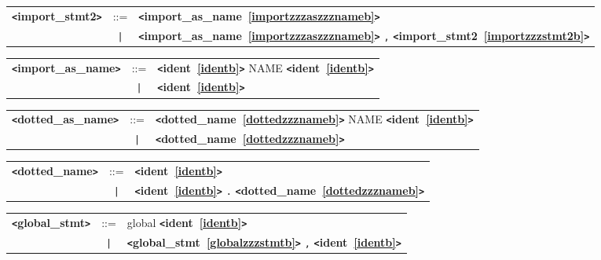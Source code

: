 \label{importzzzstmt2b}
\begin{tabular}{lcl}
{\bf \verb+<+import\_stmt2\verb+>+} & ::=  & {\bf \verb+<+import\_as\_name~\ref{importzzzaszzznameb}\verb+>+}  \\
 & \verb+|+  & {\bf \verb+<+import\_as\_name~\ref{importzzzaszzznameb}\verb+>+}  \verb|,| {\bf \verb+<+import\_stmt2~\ref{importzzzstmt2b}\verb+>+}  \\
\end{tabular}

\label{importzzzaszzznameb}
\begin{tabular}{lcl}
{\bf \verb+<+import\_as\_name\verb+>+} & ::=  & {\bf \verb+<+ident~\ref{identb}\verb+>+}  NAME {\bf \verb+<+ident~\ref{identb}\verb+>+}  \\
 & \verb+|+  & {\bf \verb+<+ident~\ref{identb}\verb+>+}  \\
\end{tabular}

\label{dottedzzzaszzznameb}
\begin{tabular}{lcl}
{\bf \verb+<+dotted\_as\_name\verb+>+} & ::=  & {\bf \verb+<+dotted\_name~\ref{dottedzzznameb}\verb+>+}  NAME {\bf \verb+<+ident~\ref{identb}\verb+>+}  \\
 & \verb+|+  & {\bf \verb+<+dotted\_name~\ref{dottedzzznameb}\verb+>+}  \\
\end{tabular}

\label{dottedzzznameb}
\begin{tabular}{lcl}
{\bf \verb+<+dotted\_name\verb+>+} & ::=  & {\bf \verb+<+ident~\ref{identb}\verb+>+}  \\
 & \verb+|+  & {\bf \verb+<+ident~\ref{identb}\verb+>+}  \verb|.| {\bf \verb+<+dotted\_name~\ref{dottedzzznameb}\verb+>+}  \\
\end{tabular}

\label{globalzzzstmtb}
\begin{tabular}{lcl}
{\bf \verb+<+global\_stmt\verb+>+} & ::=  & global {\bf \verb+<+ident~\ref{identb}\verb+>+}  \\
 & \verb+|+  & {\bf \verb+<+global\_stmt~\ref{globalzzzstmtb}\verb+>+}  \verb|,| {\bf \verb+<+ident~\ref{identb}\verb+>+}  \\
\end{tabular} \\

